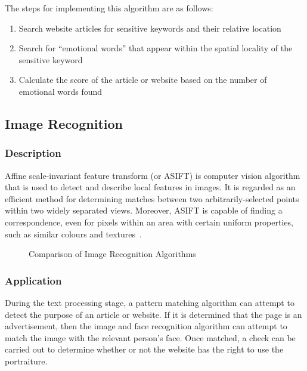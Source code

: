       The steps for implementing this algorithm are as follows:
      \begin{enumerate}
        \item Search website articles for sensitive keywords and their relative location
        \item Search for ``emotional words'' that appear within the spatial locality of the sensitive keyword
        \item Calculate the score of the article or website based on the number of emotional words found
      \end{enumerate}

  \subsection{Image Recognition}

    \subsubsection{Description}

      Affine scale-invariant feature transform (or ASIFT) is computer vision algorithm that is used to detect and describe local features in images. It is regarded as an efficient method for determining matches between two arbitrarily-selected points within two widely separated views. Moreover, ASIFT is capable of finding a correspondence, even for pixels within an area with certain uniform properties, such as similar colours and textures~\cite{}.

      \begin{figure}
        \centering
        \begin{minipage}{14cm}
          \centering
          \caption{Comparison of Image Recognition Algorithms}
          \label{fig:bitap_algorithm_pseudocode}
        \end{minipage}
      \end{figure}

    \subsubsection{Application}

      During the text processing stage, a pattern matching algorithm can attempt to detect the purpose of an article or website. If it is determined that the page is an advertisement, then the image and face recognition algorithm can attempt to match the image with the relevant person's face. Once matched, a check can be carried out to determine whether or not the website has the right to use the portraiture.
